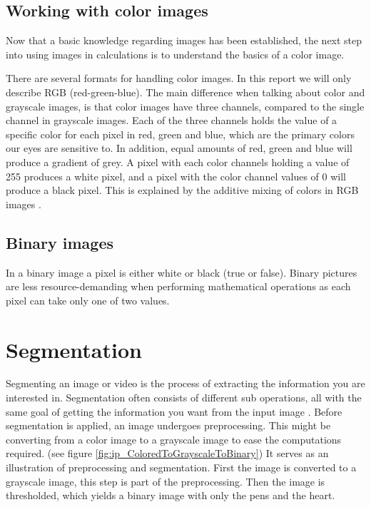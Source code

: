 \subsection{Working with color images}
Now that a basic knowledge regarding images has been established, the next step into using images in calculations is to understand the basics of a color image.

There are several formats for handling color images. In this report we will only describe RGB (red-green-blue). The main difference when talking about color and grayscale images, is that color images have three channels, compared to the single channel in grayscale images. Each of the three channels holds the value of a specific color for each pixel in red, green and blue, which are the primary colors our eyes are sensitive to. In addition, equal amounts of red, green and blue will produce a gradient of grey. A pixel with each color channels holding a value of 255 produces a white pixel, and a pixel with the color channel values of 0 will produce a black pixel. This  is explained by the additive mixing of colors in RGB images \citep{ip_book}. %

\subsection{Binary images}
In a binary image a pixel is either white or black (true or false). Binary pictures are less resource-demanding when performing mathematical operations as each pixel can take only one of two values.

\section{Segmentation}
Segmenting an image or video is the process of extracting the information you are interested in. Segmentation often consists of different sub operations, all with the same goal of getting the information you want from the input image \citep{ip_book}. Before segmentation is applied, an image undergoes preprocessing. This might be converting from a color image to a grayscale image to ease the computations required. (see figure \ref{fig:ip_ColoredToGrayscaleToBinary}) It serves as an illustration of preprocessing and segmentation. First the image is converted to a grayscale image, this step is part of the preprocessing. Then the image is thresholded, which yields a binary image with only the pens and the heart. 

